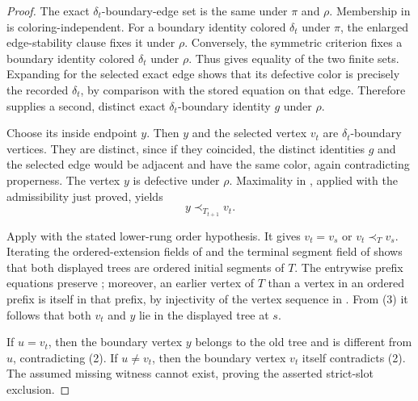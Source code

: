 \begin{proof}
The exact \(\delta_t\)-boundary-edge set is the same under \(\pi\) and
\(\rho\).  Membership in  is coloring-independent.
For a boundary identity colored \(\delta_t\) under \(\pi\), the enlarged
edge-stability clause fixes it under \(\rho\).  Conversely, the symmetric
criterion  fixes a boundary identity colored \(\delta_t\)
under \(\rho\).  Thus  gives equality of the
two finite sets.  Expanding  for the selected exact
edge shows that its defective color is precisely the recorded
\(\delta_t\), by comparison with the stored equation on that edge.
Therefore  supplies a second, distinct exact
\(\delta_t\)-boundary identity \(g\) under \(\rho\).

Choose its inside endpoint \(y\).  Then \(y\) and the selected vertex
\(v_t\) are \(\delta_t\)-boundary vertices.  They are distinct, since if
they coincided, the distinct identities \(g\) and the selected edge would
be adjacent and have the same color, again contradicting properness.  The
vertex \(y\) is defective under \(\rho\).  Maximality in
, applied with the admissibility just
proved, yields
\[
                    y\prec_{T_{t+1}}v_t.                    \tag{3}
\]

Apply  with the stated lower-rung order
hypothesis.  It gives \(v_t=v_s\) or \(v_t\prec_Tv_s\).  Iterating the
ordered-extension fields of  and the terminal
segment field of  shows that both displayed
trees are ordered initial segments of \(T\).  The entrywise prefix equations
preserve ; moreover, an earlier vertex of \(T\)
than a vertex in an ordered prefix is itself in that prefix, by injectivity
of the vertex sequence in .  From (3) it follows that
both \(v_t\) and \(y\) lie in the displayed tree at \(s\).

If \(u=v_t\), then the boundary vertex \(y\) belongs to the old tree and is
different from \(u\), contradicting (2).  If \(u\ne v_t\), then the boundary
vertex \(v_t\) itself contradicts (2).  The assumed missing witness cannot
exist, proving the asserted strict-slot exclusion.
\end{proof}
